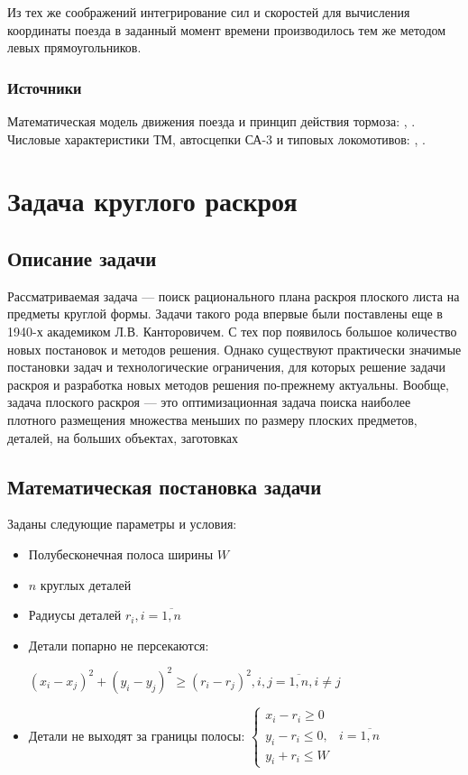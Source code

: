 Из тех же соображений интегрирование сил и скоростей для вычисления координаты поезда в заданный момент времени производилось тем же методом левых прямоугольников.

\subsubsection{Источники}
Математическая модель движения поезда и принцип действия тормоза: \cite[стр. 2]{charsBM2}, \cite[стр. 42]{charsBM2}.
Числовые характеристики ТМ, автосцепки СА-3 и типовых локомотивов: \cite{Coupler}, \cite{charsBM1}.

\section{Задача круглого раскроя}
\subsection{Описание задачи}
Рассматриваемая задача — поиск рационального плана раскроя плоского листа на предметы круглой формы. Задачи такого рода впервые
были поставлены еще в 1940-х академиком Л.В. Канторовичем. С тех пор появилось большое количество новых постановок и методов решения. Однако существуют практически значимые 
постановки задач и технологические ограничения, для которых решение задачи раскроя и
разработка новых методов решения по-прежнему актуальны.
Вообще, задача плоского раскроя — это оптимизационная задача поиска наиболее плотного размещения множества меньших по размеру 
плоских предметов, деталей, на больших объектах, заготовках

\subsection{Математическая постановка задачи}
Заданы следующие параметры и условия:
\begin{itemize}
\item Полубесконечная полоса ширины $W$ 
\item $n$ круглых деталей
\item Радиусы деталей  $r_{i}, i = \overline{1, n}$
\item Детали попарно не персекаются:

$(x_{i} - x_{j})^{2} + (y_{i} - y_{j})^{2} \ge (r_{i} - r_{j})^{2}, i, j = \overline{1, n}, i \neq j$
\item Детали не выходят за границы полосы: 
$%
\begin{cases}
	x_{i} - r_{i} \ge 0 \\
	y_{i} - r_{i} \le 0,	& i = \overline{1, n} \\
	y_{i} + r_{i} \le W
\end{cases}
$%
\end{itemize}

